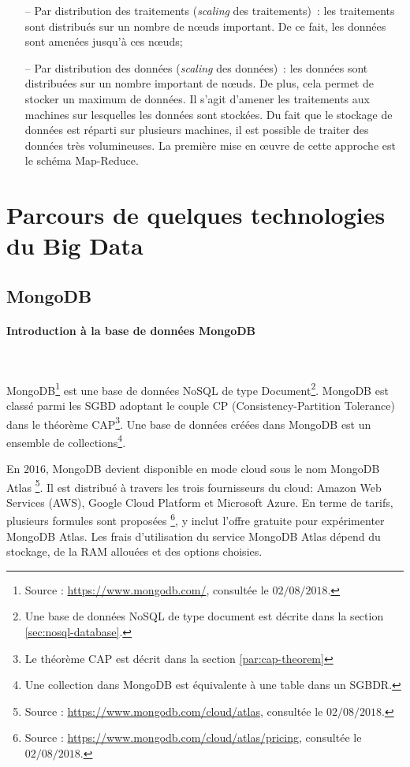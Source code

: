		
		\begin{itemize}
			\item[--] Par distribution des traitements (\textit{scaling} des traitements)~: les traitements sont distribués sur un nombre de n\oe{}uds important. De ce fait, les données sont amenées jusqu'à ces n\oe{}uds;
			
			\item[--] Par distribution des données (\textit{scaling} des données)~: les données sont distribuées sur un nombre important de n\oe{}uds. De plus, cela permet  de stocker un maximum de données. Il s'agit d'amener les traitements aux machines sur lesquelles les données sont stockées. Du fait que le stockage de données est réparti sur plusieurs machines, il est possible de traiter des données très volumineuses. La première mise en \oe{}uvre de cette approche est le schéma Map-Reduce. 
		\end{itemize}
	\section{Parcours de quelques technologies du Big Data}
	\subsection{MongoDB}
	
	
	\paragraph{Introduction à la base de données MongoDB} \label{subsubsection:mongodb}~
	
	MongoDB\footnote{Source : \url{https://www.mongodb.com/}, consultée le $02/08/2018$.} est une base de données  NoSQL de type Document\footnote{Une base de données NoSQL de type document est décrite dans la section \ref{sec:nosql-database}.}.  MongoDB est classé parmi les  SGBD adoptant le couple CP (Consistency-Partition Tolerance) dans le théorème  CAP\footnote{Le théorème  CAP est décrit dans la section \ref{par:cap-theorem}}. Une base de données créées dans MongoDB est un ensemble de collections\footnote{Une collection dans MongoDB est équivalente à une table dans un SGBDR.}.
	
	En $ 2016 $, MongoDB devient disponible en mode cloud sous le nom  MongoDB Atlas \footnote{Source : \url{https://www.mongodb.com/cloud/atlas}, consultée le $ 02/08/2018 $.}.  Il est distribué à travers les trois fournisseurs du cloud: Amazon Web Services (AWS), Google Cloud Platform et Microsoft Azure.  En terme de tarifs, plusieurs formules sont proposées \footnote{Source : \url{https://www.mongodb.com/cloud/atlas/pricing}, consultée le $ 02/08/2018 $.}, y inclut l'offre gratuite pour expérimenter MongoDB Atlas.  Les frais d'utilisation du service MongoDB Atlas dépend du stockage, de la  RAM allouées et des options choisies.
	
